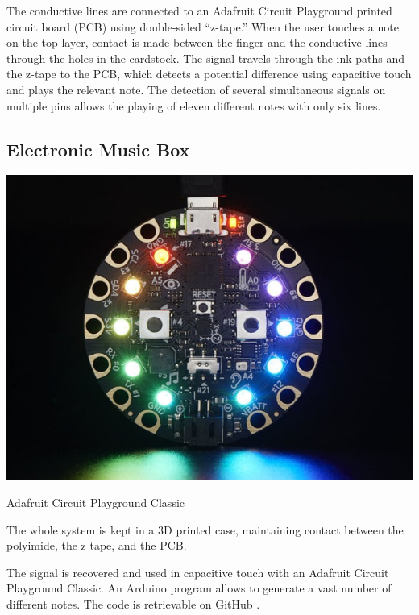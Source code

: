 The conductive lines are connected to an Adafruit Circuit Playground printed circuit
board (PCB) using double-sided “z-tape.”
When the user touches a note on the top layer, contact is made between the finger and
the conductive lines through the holes in the cardstock. The signal travels through the
ink paths and the z-tape to the PCB, which detects a potential difference using
capacitive touch and plays the relevant note. The detection of several simultaneous
signals on multiple pins allows the playing of eleven different notes with only six lines.


\subsection{Electronic Music Box}


\begin{marginfigure}
    \centering
    \includegraphics{images/circuit_playground_classic.jpg}
    \caption{Adafruit Circuit Playground Classic}
    \label{fig:circuit_playground_classic}
\end{marginfigure}

The whole system is kept in a 3D printed case, maintaining contact between the polyimide, the z tape, and the PCB.

The signal is recovered and used in capacitive touch with an Adafruit Circuit Playground Classic. An Arduino program allows to generate a vast number of different notes. The code is retrievable on GitHub \cite{adrien2022capacitive_to_notes}.

